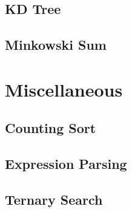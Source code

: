 \subsection{KD Tree}
\raggedbottom
\hrulefill
\subsection{Minkowski Sum}
\raggedbottom
\hrulefill

\section{Miscellaneous}
\subsection{Counting Sort}
\raggedbottom
\hrulefill
\subsection{Expression Parsing}
\raggedbottom
\hrulefill
\subsection{Ternary Search}
\raggedbottom
\hrulefill
